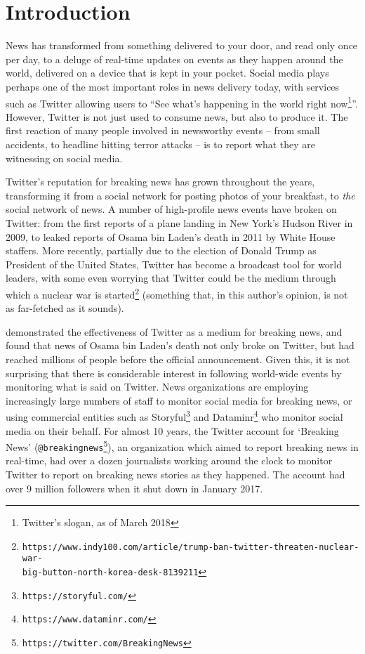 
\newpage
\chapter{Introduction}
\label{chapter:introduction}
News has transformed from something delivered to your door, and read only once per day, to a deluge of real-time updates on events as they happen around the world, delivered on a device that is kept in your pocket.
Social media plays perhaps one of the most important roles in news delivery today, with services such as Twitter allowing users to ``See what’s happening in the world right now\footnote{Twitter's slogan, as of March 2018}''.
However, Twitter is not just used to consume news, but also to produce it.
The first reaction of many people involved in newsworthy events -- from small accidents, to headline hitting terror attacks -- is to report what they are witnessing on social media.

Twitter's reputation for breaking news has grown throughout the years, transforming it from a social network for posting photos of your breakfast, to \emph{the} social network of news.
A number of high-profile news events have broken on Twitter: from the first reports of a plane landing in New York's Hudson River in 2009, to leaked reports of Osama bin Laden's death in 2011 by White House staffers.
More recently, partially due to the election of Donald Trump as President of the United States, Twitter has become a broadcast tool for world leaders, with some even worrying that Twitter could be the medium through which a nuclear war is started\footnote{\texttt{https://www.indy100.com/article/trump-ban-twitter-threaten-nuclear-war-\\big-button-north-korea-desk-8139211}} (something that, in this author's opinion, is not as far-fetched as it sounds).

\cite{Hu:2012:BNT:2208636.2208672} demonstrated the effectiveness of Twitter as a medium for breaking news, and found that news of Osama bin Laden's death not only broke on Twitter, but had reached millions of people before the official announcement.
Given this, it is not surprising that there is considerable interest in following world-wide events by monitoring what is said on Twitter.
News organizations are employing increasingly large numbers of staff to monitor social media for breaking news, or using commercial entities such as Storyful\footnote{\texttt{https://storyful.com/}} and Dataminr\footnote{\texttt{https://www.dataminr.com/}} who monitor social media on their behalf.
For almost 10 years, the Twitter account for `Breaking News' (\texttt{@breakingnews}\footnote{\texttt{https://twitter.com/BreakingNews}}), an organization which aimed to report breaking news in real-time, had over a dozen journalists working around the clock to monitor Twitter to report on breaking news stories as they happened. The account had over 9 million followers when it shut down in January 2017.

